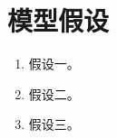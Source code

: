 \section{模型假设}
\begin{enumerate}[label=\arabic*)]
  \item 假设一。
  \item 假设二。
  \item 假设三。
\end{enumerate}
